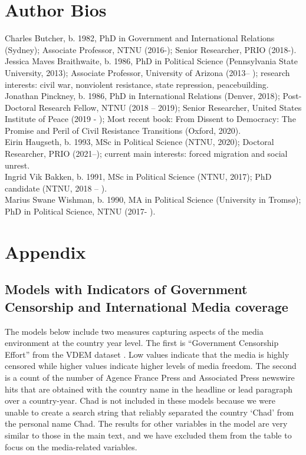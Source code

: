 \section{Author Bios}

Charles Butcher, b. 1982, PhD in Government and International Relations (Sydney); Associate Professor, NTNU (2016-); Senior Researcher, PRIO (2018-). \\

Jessica Maves Braithwaite, b. 1986, PhD in Political Science (Pennsylvania State University, 2013); Associate Professor, University of Arizona (2013– ); research interests: civil war, nonviolent resistance, state repression, peacebuilding.\\

Jonathan Pinckney, b. 1986, PhD in International Relations (Denver, 2018); Post-Doctoral Research Fellow, NTNU (2018 – 2019); Senior Researcher, United States Institute of Peace (2019 - ); Most recent book: From Dissent to Democracy: The Promise and Peril of Civil Resistance Transitions (Oxford, 2020).\\

Eirin Haugseth, b. 1993, MSc in Political Science (NTNU, 2020); Doctoral Researcher, PRIO (2021–); current main interests: forced migration and social unrest.\\

Ingrid Vik Bakken, b. 1991, MSc in Political Science (NTNU, 2017); PhD candidate (NTNU, 2018 -- ).\\

Marius Swane Wishman, b. 1990, MA in Political Science (University in Tromsø); PhD in Political Science, NTNU (2017- ).\\


\clearpage




\clearpage

\section{Appendix}

\subsection{Models with Indicators of Government Censorship and International Media coverage}

The models below include two measures capturing aspects of the media environment at the country year level. The first is ``Government Censorship Effort'' from the VDEM dataset \citep{Coppedge2019}. Low values indicate that the media is highly censored while higher values indicate higher levels of media freedom. The second is a count of the number of Agence France Press and Associated Press newswire hits that are obtained with the country name in the headline or lead paragraph over a country-year. Chad is not included in these models because we were unable to create a search string that reliably separated the country `Chad' from the personal name Chad. The results for other variables in the model are very similar to those in the main text, and we have excluded them from the table to focus on the media-related variables. 

